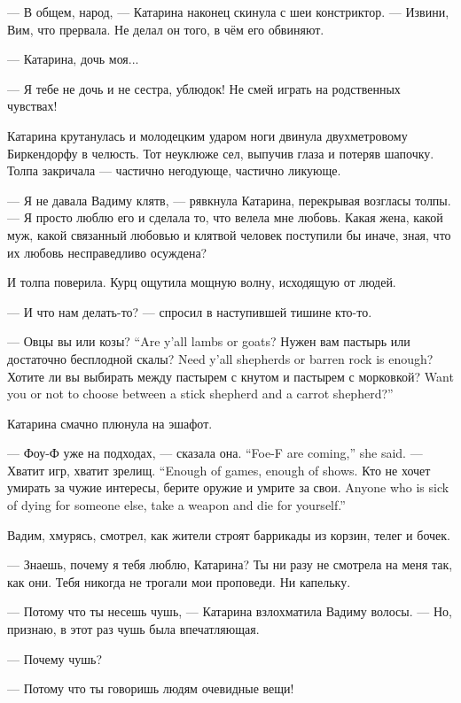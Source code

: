 --- В общем, народ, --- Катарина наконец скинула с шеи констриктор.
--- Извини, Вим, что прервала.
Не делал он того, в чём его обвиняют.

--- Катарина, дочь моя...

--- Я тебе не дочь и не сестра, ублюдок!
Не смей играть на родственных чувствах!

Катарина крутанулась и молодецким ударом ноги двинула двухметровому Биркендорфу в челюсть.
Тот неуклюже сел, выпучив глаза и потеряв шапочку.
Толпа закричала --- частично негодующе, частично ликующе.

--- Я не давала Вадиму клятв, --- рявкнула Катарина, перекрывая возгласы толпы.
--- Я просто люблю его и сделала то, что велела мне любовь.
Какая жена, какой муж, какой связанный любовью и клятвой человек поступили бы иначе, зная, что их любовь несправедливо осуждена?

И толпа поверила.
Курц ощутила мощную волну, исходящую от людей.

--- И что нам делать-то? --- спросил в наступившей тишине кто-то.

{--- Овцы вы или козы?}
{``Are y'all lambs or goats?}
{Нужен вам пастырь или достаточно бесплодной скалы?}
{Need y'all shepherds or barren rock is enough?}
{Хотите ли вы выбирать между пастырем с кнутом и пастырем с морковкой?}
{Want you or not to choose between a stick shepherd and a carrot shepherd?''}

Катарина смачно плюнула на эшафот.

{--- Фоу-Ф уже на подходах, --- сказала она.}
{``Foe-F are coming,'' she said.}
{--- Хватит игр, хватит зрелищ.}
{``Enough of games, enough of shows.}
{Кто не хочет умирать за чужие интересы, берите оружие и умрите за свои.}
{Anyone who is sick of dying for someone else, take a weapon and die for yourself.''}

\textspace

Вадим, хмурясь, смотрел, как жители строят баррикады из корзин, телег и бочек.

--- Знаешь, почему я тебя люблю, Катарина?
Ты ни разу не смотрела на меня так, как они.
Тебя никогда не трогали мои проповеди.
Ни капельку.

--- Потому что ты несешь чушь, --- Катарина взлохматила Вадиму волосы.
--- Но, признаю, в этот раз чушь была впечатляющая.

--- Почему чушь?

--- Потому что ты говоришь людям очевидные вещи!

